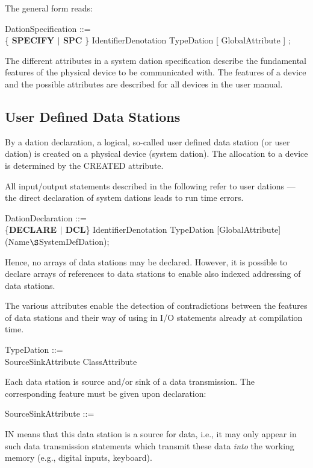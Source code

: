The general form reads:

DationSpecification ::= \\
\x \{ {\bf SPECIFY $\mid$ SPC} \} IdentifierDenotation TypeDation [ GlobalAttribute ] ;

The different attributes in a system dation specification describe the
fundamental features of the physical device to be communicated with. The
features of a device and the possible attributes are described for all
devices in the user manual.

\subsection{User Defined Data Stations}    %

By a dation declaration, a logical, so-called user defined data station
(or user dation) is created on a physical device (system dation). The
allocation to a device is determined by the CREATED attribute.

All input/output statements described in the following refer to user
dations --- the direct declaration of system dations leads to run time
errors.

DationDeclaration ::= \\
\x \{{\bf DECLARE $\mid$ DCL}\} IdentifierDenotation TypeDation [GlobalAttribute]\\
 (Name$\S $SystemDefDation);

Hence, no arrays of data stations may be declared. However, it is
possible to declare arrays of references to data stations to enable also
indexed addressing of data stations.

The various attributes enable the detection of contradictions between
the features of data stations and their way of using in I/O statements
already at compilation time.

TypeDation ::= \\
 SourceSinkAttribute ClassAttribute\\
\x [ Structure ] [ AccessAttribute ]

Each data station is source and/or sink of a data transmission. The
corresponding feature must be given upon declaration:

SourceSinkAttribute ::= \\

IN means that this data station is a source for data, i.e., it may only
appear in such data transmission statements which transmit these data
{\em into} the working memory (e.g., digital inputs, keyboard).

